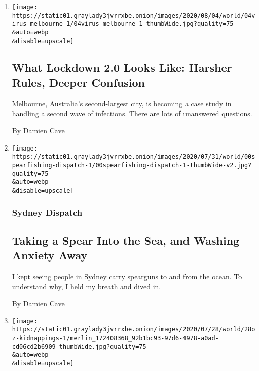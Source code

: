 \begin{enumerate}
\def\labelenumi{\arabic{enumi}.}
\item
  \href{/2020/08/04/world/australia/coronavirus-melbourne-lockdown.html}{}

  \texttt{[image: https://static01.graylady3jvrrxbe.onion/images/2020/08/04/world/04virus-melbourne-1/04virus-melbourne-1-thumbWide.jpg?quality=75\\\&auto=webp\\\&disable=upscale]}

  \hypertarget{what-lockdown-20-looks-like-harsher-rules-deeper-confusion}{%
  \subsection{What Lockdown 2.0 Looks Like: Harsher Rules, Deeper
  Confusion}\label{what-lockdown-20-looks-like-harsher-rules-deeper-confusion}}

  Melbourne, Australia's second-largest city, is becoming a case study
  in handling a second wave of infections. There are lots of unanswered
  questions.

  By Damien Cave
\item
  \href{/2020/08/03/world/australia/spearfishing-sydney-coronavirus.html}{}

  \texttt{[image: https://static01.graylady3jvrrxbe.onion/images/2020/07/31/world/00spearfishing-dispatch-1/00spearfishing-dispatch-1-thumbWide-v2.jpg?quality=75\\\&auto=webp\\\&disable=upscale]}

  \hypertarget{sydney-dispatch}{%
  \subsubsection{Sydney Dispatch}\label{sydney-dispatch}}

  \hypertarget{taking-a-spear-into-the-sea-and-washing-anxiety-away}{%
  \subsection{Taking a Spear Into the Sea, and Washing Anxiety
  Away}\label{taking-a-spear-into-the-sea-and-washing-anxiety-away}}

  I kept seeing people in Sydney carry spearguns to and from the ocean.
  To understand why, I held my breath and dived in.

  By Damien Cave
\item
  \href{/2020/07/28/world/australia/chinese-students-virtual-kidnapping.html}{}

  \texttt{[image: https://static01.graylady3jvrrxbe.onion/images/2020/07/28/world/28oz-kidnappings-1/merlin\_172408368\_92b1bc93-97d6-4978-a0ad-cd06cd2b6909-thumbWide.jpg?quality=75\\\&auto=webp\\\&disable=upscale]}


\end{enumerate}
